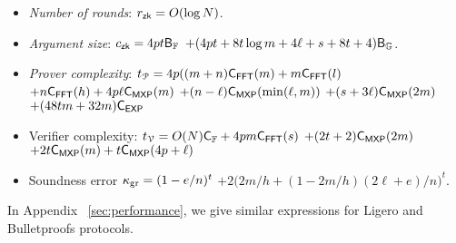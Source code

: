 \begin{itemize}
\item {\em Number of rounds}: $r_\mathsf{zk}=O(\log{N})$.
\item {\em Argument size}: $c_\mathsf{zk}= 4pt\mathsf{B}_\mathbb{F}$
$+(4pt+8t\log{m}+4\ell+s+8t+4)\mathsf{B}_\mathbb{G}$.
\item {\em Prover complexity}: $t_{\mathcal{P}}=4p((m+n)\mathsf{C}_\mathsf{FFT}(m)+m\mathsf{C}_\mathsf{FFT}(l)$
$+n\mathsf{C}_\mathsf{FFT}(h) + 4p\ell\mathsf{C}_\mathsf{MXP}(m)$
 $+(n-\ell)\mathsf{C}_\mathsf{MXP}(\min(\ell,m))$
 $+(s+3\ell)\mathsf{C}_\mathsf{MXP}(2m)$ $+ (48tm+32m)\mathsf{C}_\mathsf{EXP}$
\item {Verifier complexity}:  $t_{\mathcal{V}}=O(N)\mathsf{C}_\mathbb{F} + 4pm\mathsf{C}_\mathsf{FFT}(s)$
 $+(2t+2)\mathsf{C}_\mathsf{MXP}(2m)$
 $+2t\mathsf{C}_\mathsf{MXP}(m)+t\mathsf{C}_\mathsf{MXP}(4p+\ell)$
\item{Soundness error} $\kappa_{\rm gr} = (1-e/n)^t$
 $+2\big(2m/h+(1-2m/h)(2\ell+e)/n\big)^t$.
\end{itemize}

In Appendix ~\ref{sec:performance}, we give similar expressions for Ligero and
Bulletproofs protocols. 


